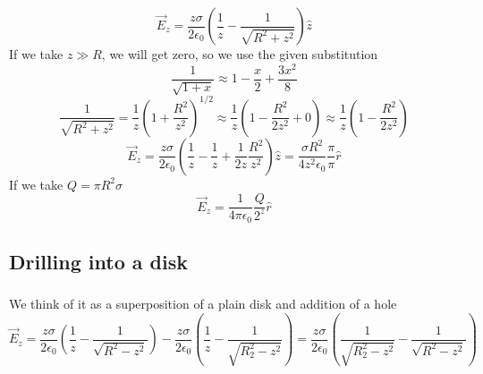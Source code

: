 \[
	\vec{E}_z = \frac{z \sigma}{2 \epsilon_0}
	( \frac{1}{z} - \frac{1}{\sqrt{R^2+z^2}} ) \hat{z}
\]
If we take \(z \gg R\), we will get zero, so we use the given substitution
\[
	\frac{1}{\sqrt{1 + x}} \approx 1 - \frac{x}{2} + \frac{3 x^2}{8}
\]
\[
	\frac{1}{\sqrt{R^2+z^2}} = \frac{1}{z} (1 + \frac{R^2}{z^2})^{1/2}
	\approx \frac{1}{z} (1 - \frac{R^2}{2 z^2} + 0)
	\approx \frac{1}{z} (1 - \frac{R^2}{2 z^2})
\]
\[
	\vec{E}_z = \frac{z \sigma}{2 \epsilon_0}
	( \frac{1}{z} - \frac{1}{z}  + \frac{1}{2 z} \frac{R^2}{z^2}) \hat{z}
	= \frac{\sigma R^2}{4 z^2 \epsilon_0} \frac{\pi}{\pi} \hat{r}
\]
If we take \(Q = \pi R^2 \sigma\)
\[
	\vec{E}_z = \frac{1}{4 \pi \epsilon_0} \frac{Q}{2^z} \hat{r}
\]

\subsection{Drilling into a disk}

\subsubsection{}

We think of it as a superposition of a plain disk and addition of a hole
\[
	\vec{E}_z = \frac{z \sigma}{2 \epsilon_0}
	( \frac{1}{z} - \frac{1}{\sqrt{R^2 - z^2}} ) -
	\frac{z \sigma}{2 \epsilon_0}
	( \frac{1}{z} - \frac{1}{\sqrt{R_2^2 - z^2}} )
	= \frac{z \sigma}{2 \epsilon_0}
	( \frac{1}{\sqrt{R_2^2 - z^2}} - \frac{1}{\sqrt{R^2 - z^2}} )
\]

\subsubsection{}
